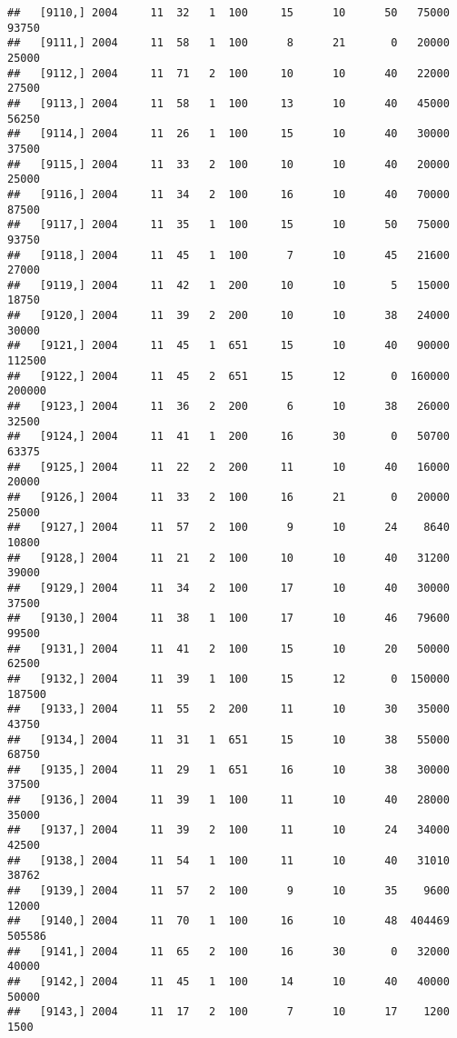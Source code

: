 \documentclass{article}\usepackage[]{graphicx}\usepackage[]{color}
\makeatletter
\newenvironment{kframe}{%
 \def\at@end@of@kframe{}%
 \ifinner\ifhmode%
  \def\at@end@of@kframe{\end{minipage}}%
  \begin{minipage}{\columnwidth}%
 \fi\fi%
 \def\FrameCommand##1{\hskip\@totalleftmargin \hskip-\fboxsep
 \colorbox{shadecolor}{##1}\hskip-\fboxsep
     \hskip-\linewidth \hskip-\@totalleftmargin \hskip\columnwidth}%
 \MakeFramed {\advance\hsize-\width
   \@totalleftmargin\z@ \linewidth\hsize
   \@setminipage}}%
 {\par\unskip\endMakeFramed%
 \at@end@of@kframe}
\newenvironment{knitrout}{}{} %
\makeatother
\begin{document}
\begin{knitrout}
\begin{kframe}
\begin{verbatim}
##   [9110,] 2004     11  32   1  100     15      10      50   75000   93750
##   [9111,] 2004     11  58   1  100      8      21       0   20000   25000
##   [9112,] 2004     11  71   2  100     10      10      40   22000   27500
##   [9113,] 2004     11  58   1  100     13      10      40   45000   56250
##   [9114,] 2004     11  26   1  100     15      10      40   30000   37500
##   [9115,] 2004     11  33   2  100     10      10      40   20000   25000
##   [9116,] 2004     11  34   2  100     16      10      40   70000   87500
##   [9117,] 2004     11  35   1  100     15      10      50   75000   93750
##   [9118,] 2004     11  45   1  100      7      10      45   21600   27000
##   [9119,] 2004     11  42   1  200     10      10       5   15000   18750
##   [9120,] 2004     11  39   2  200     10      10      38   24000   30000
##   [9121,] 2004     11  45   1  651     15      10      40   90000  112500
##   [9122,] 2004     11  45   2  651     15      12       0  160000  200000
##   [9123,] 2004     11  36   2  200      6      10      38   26000   32500
##   [9124,] 2004     11  41   1  200     16      30       0   50700   63375
##   [9125,] 2004     11  22   2  200     11      10      40   16000   20000
##   [9126,] 2004     11  33   2  100     16      21       0   20000   25000
##   [9127,] 2004     11  57   2  100      9      10      24    8640   10800
##   [9128,] 2004     11  21   2  100     10      10      40   31200   39000
##   [9129,] 2004     11  34   2  100     17      10      40   30000   37500
##   [9130,] 2004     11  38   1  100     17      10      46   79600   99500
##   [9131,] 2004     11  41   2  100     15      10      20   50000   62500
##   [9132,] 2004     11  39   1  100     15      12       0  150000  187500
##   [9133,] 2004     11  55   2  200     11      10      30   35000   43750
##   [9134,] 2004     11  31   1  651     15      10      38   55000   68750
##   [9135,] 2004     11  29   1  651     16      10      38   30000   37500
##   [9136,] 2004     11  39   1  100     11      10      40   28000   35000
##   [9137,] 2004     11  39   2  100     11      10      24   34000   42500
##   [9138,] 2004     11  54   1  100     11      10      40   31010   38762
##   [9139,] 2004     11  57   2  100      9      10      35    9600   12000
##   [9140,] 2004     11  70   1  100     16      10      48  404469  505586
##   [9141,] 2004     11  65   2  100     16      30       0   32000   40000
##   [9142,] 2004     11  45   1  100     14      10      40   40000   50000
##   [9143,] 2004     11  17   2  100      7      10      17    1200    1500

\end{verbatim}
\end{kframe}
\end{knitrout}
\end{document}
